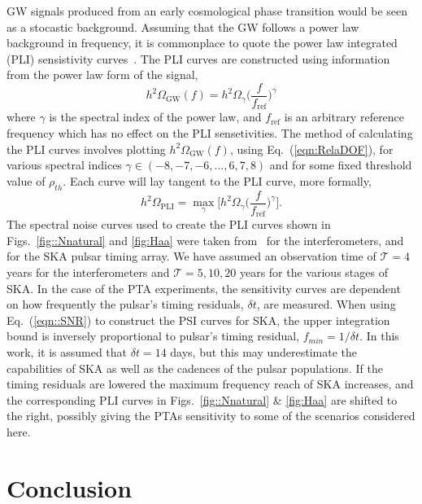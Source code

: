 \documentclass[nofootinbib,twocolumn,preprintnumbers]{revtex4-1}
\begin{document}
GW signals produced from an early cosmological phase transition would be seen as a stocastic background. Assuming that the GW follows a power law background in frequency, it is commonplace to quote the power law integrated (PLI) sensistivity curves~\cite{PhysRevD.88.124032}. The PLI curves are constructed using information from the power law form of the signal,
\begin{equation}
h^2 \Omega_{\textrm{GW}}(f) = h^2 \Omega_{\gamma}  \bigg(\frac{f}{f_{\textrm{ref}}}\bigg)^{\gamma}
\end{equation}
where $\gamma$ is the spectral index of the power law, and $f_{\textrm{ref}}$ is an arbitrary reference frequency which has no effect on the PLI sensetivities. 
The method of calculating the PLI curves involves plotting $h^2 \Omega_{\textrm{GW}}(f) $, using Eq.~(\ref{eqn:RelaDOF}), for various spectral indices $\gamma \in (-8,-7,-6, ... , 6, 7, 8)$ and for some fixed threshold value of $\rho_{th}$. Each curve will lay tangent to the PLI curve, more formally,
\begin{equation}
h^2 \Omega_{\textrm{PLI}} = \max\limits_{\gamma}\bigg[ h^2 \Omega_{\gamma}\bigg(\frac{f}{f_{\textrm{ref}}}\bigg)^{\gamma}  \bigg].
\end{equation}
The spectral noise curves used to create the PLI curves shown in Figs.~\ref{fig::Nnatural} and \ref{fig:Haa} were taken 
from~\citep{Robson_2019,PhysRevD.83.084036,doi:10.1142/S0218271813410137,10.1093/ptep/pty078, Breitbach:2018ddu} for the interferometers, and~\citep{Breitbach:2018ddu, Janssen:2014dka} 
for the SKA pulsar timing array. 
We have assumed an observation time of $\mathcal{T} = 4 $ years for the interferometers and $\mathcal{T}= 5, 10, 20 $  years for the various stages of SKA. 
In the case of the PTA experiments, the sensitivity curves are dependent on how frequently the pulsar's timing residuals, $\delta t$, are measured. 
When using Eq.~(\ref{eqn::SNR}) to construct the PSI curves for SKA, the upper integration bound is inversely proportional to pulsar's timing residual, $f_{min} = 1/\delta t$.  In this work, it is assumed that $\delta t = 14$ days, but this may underestimate the capabilities of SKA as well as the cadences of the pulsar populations. If the timing residuals are lowered the maximum frequency reach of SKA increases, and the corresponding PLI curves in Figs.~\ref{fig::Nnatural} $\&$ \ref{fig:Haa} are shifted to the right, possibly giving the PTAs sensitivity to some of the scenarios considered here.


\section{Conclusion}
\label{sec:conclusion}
\end{document}
